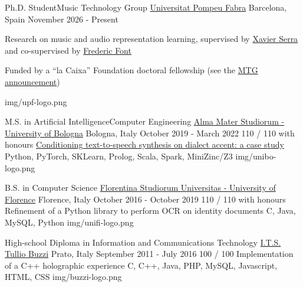 
\begin{cventries}

  \logocventry
    {Ph.D. Student{\enskip\cdotp\enskip}Music Technology Group}
    {\href{https://www.upf.edu/}{Universitat Pompeu Fabra}}
    {Barcelona, Spain}
    {November 2026 - Present}
    {
      \begin{cvitems}
        \item {Research on music and audio representation learning, supervised by \textcolor{blue}{\href{https://www.upf.edu/web/xavier-serra}{Xavier Serra}} and co-supervised by \textcolor{blue}{\href{https://ffont.github.io/}{Frederic Font}}}
        \item {Funded by a “la Caixa” Foundation doctoral fellowship (see the \textcolor{blue}{\href{https://www.upf.edu/web/mtg/home/-/asset_publisher/sWCQhjdDLWwE/content/three-new-phd-students-join-the-mtg-in-2026/maximized}{MTG announcement}})}
      \end{cvitems}
      \vspace{5.0mm}
    }
    {img/upf-logo.png}

  \logocventry
    {M.S. in Artificial Intelligence{\enskip\cdotp\enskip}Computer Engineering}
    {\href{https://www.unibo.it/en/homepage}{Alma Mater Studiorum - University of Bologna}}
    {Bologna, Italy}
    {October 2019 - March 2022}
    {
      \cvedu
        {110 / 110 with honours}
        {\href{https://amslaurea.unibo.it/id/eprint/25805/}{Conditioning text-to-speech synthesis on dialect accent: a case study}}
        {Python, PyTorch, SKLearn, Prolog, Scala, Spark, MiniZinc/Z3}
    }
    {img/unibo-logo.png}

  \logocventry
    {B.S. in Computer Science}
    {\href{https://www.unifi.it/}{Florentina Studiorum Universitas - University of Florence}}
    {Florence, Italy}
    {October 2016 - October 2019}
    {
      \cvedu
        {110 / 110 with honours}
        {Refinement of a Python library to perform OCR on identity documents}
        {C, Java, MySQL, Python}
    }
    {img/unifi-logo.png}

  \logocventry
    {High-school Diploma in Information and Communications Technology}
    {\href{https://www.tulliobuzzi.edu.it/}{I.T.S. Tullio Buzzi}}
    {Prato, Italy}
    {September 2011 - July 2016}
    {
      \cvedu
        {100 / 100}
        {Implementation of a C++ holographic experience}
        {C, C++, Java, PHP, MySQL, Javascript, HTML, CSS}
    }
    {img/buzzi-logo.png}

\end{cventries}
